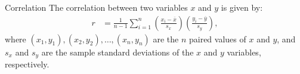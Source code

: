 \begin{onebox}{Correlation}%
		The correlation between two variables $x$ and $y$ is given by:
		\begin{align}
		r &=  \frac{1}{n-1}\sum^{n}_{i=1}
		\left(\frac{x_{i}-\overline{x}}
		{s_{x}}\right)\left(\frac{y_{i}-\overline{y}}{s_{y}}\right),
		\label{correlationEquation}
		\end{align}
		where $(x_1,y_1), (x_2,y_2), \ldots, (x_n, y_n)$ are the $n$ paired values of $x$ and $y$, and $s_x$ and $s_y$ are the sample standard deviations of the $x$ and $y$
		variables, respectively.
\end{onebox}


